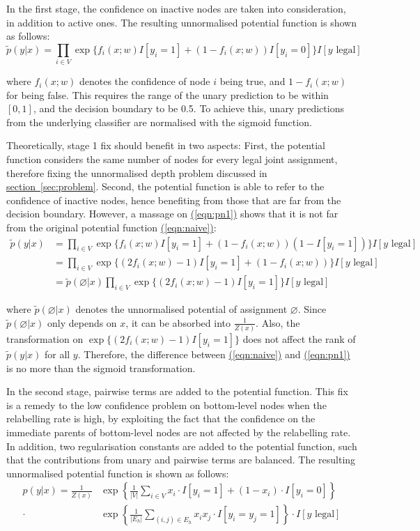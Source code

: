 \documentclass[11pt,a4paper]{article}
\begin{document}
In the first stage, the confidence on inactive nodes are taken into consideration, in addition to active ones. The resulting unnormalised potential function is shown as follows:
\begin{equation}
\tilde{p}(y|x)=\prod_{i\in V}\exp\{f_i(x;w)I[y_i=1]+(1-f_i(x;w))I[y_i=0]\}I[y\text{ legal}]
\label{eqn:pn1}
\end{equation}

where $f_i(x;w)$ denotes the confidence of node $i$ being true, and $1-f_i(x;w)$ for being false. This requires the range of the unary prediction to be within $[0,1]$, and the decision boundary to be 0.5. To achieve this, unary predictions from the underlying classifier are normalised with the sigmoid function.

Theoretically, stage 1 fix should benefit in two aspects: First, the potential function considers the same number of nodes for every legal joint assignment, therefore fixing the unnormalised depth problem discussed in \hyperref[sec:problem]{section~\ref{sec:problem}}. Second, the potential function is able to refer to the confidence of inactive nodes, hence benefiting from those that are far from the decision boundary. However, a massage on \hyperref[eqn:pn1]{(\ref{eqn:pn1})} shows that it is not far from the original potential function \hyperref[eqn:naive]{(\ref{eqn:naive})}:
\begin{align}
\tilde{p}(y|x)&=\prod_{i\in V}\exp\{f_i(x;w)I[y_i=1]+(1-f_i(x;w))(1-I[y_i=1])\}I[y\text{ legal}]\nonumber\\
&=\prod_{i\in V}\exp\{(2f_i(x;w)-1)I[y_i=1]+(1-f_i(x;w))\}I[y\text{ legal}]\nonumber\\
&=\tilde{p}(\varnothing|x)\prod_{i\in V}\exp\{(2f_i(x;w)-1)I[y_i=1]\}I[y\text{ legal}]
\label{eqn:pn2}
\end{align}

where $\tilde{p}(\varnothing|x)$ denotes the unnormalised potential of assignment $\varnothing$. Since $\tilde{p}(\varnothing|x)$ only depends on $x$, it can be absorbed into $\frac{1}{Z(x)}$. Also, the transformation on $\exp\{(2f_i(x;w)-1)I[y_i=1]\}$ does not affect the rank of $\tilde{p}(y|x)$ for all $y$. Therefore, the difference between \hyperref[eqn:naive]{(\ref{eqn:naive})} and \hyperref[eqn:pn1]{(\ref{eqn:pn1})} is no more than the sigmoid transformation.

In the second stage, pairwise terms are added to the potential function. This fix is a remedy to the low confidence problem on bottom-level nodes when the relabelling rate is high, by exploiting the fact that the confidence on the immediate parents of bottom-level nodes are not affected by the relabelling rate. In addition, two regularisation constants are added to the potential function, such that the contributions from unary and pairwise terms are balanced. The resulting unnormalised potential function is shown as follows:
\begin{align}
p(y|x)=\frac{1}{Z(x)}&\exp\left\{\frac{1}{|V|}\sum_{i\in V}x_i\cdot I[y_i=1]+(1-x_i)\cdot I[y_i=0]\right\}\nonumber\\
\cdot&\exp\left\{\frac{1}{|E_h|}\sum_{(i,j)\in E_h}x_ix_j\cdot I[y_i=y_j=1]\right\}\cdot I[y\text{ legal}]
\end{align}
\end{document}
